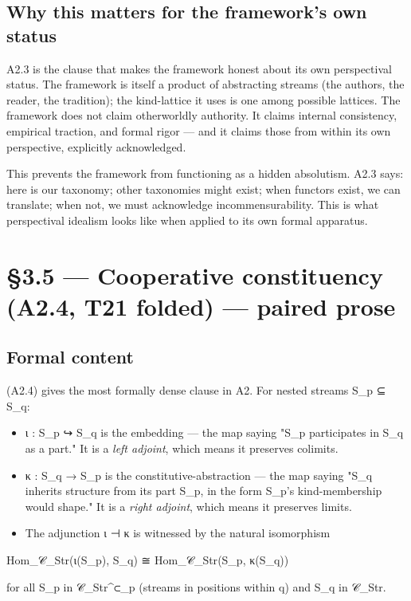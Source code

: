 \documentclass[11pt, openany]{book}
\newcommand{\sectionbreak}{\clearpage}
\begin{document}
\subsection{Why this matters for the framework's own status}

A2.3 is the clause that makes the framework honest about its own perspectival status. The framework is itself a product of abstracting streams (the authors, the reader, the tradition); the kind-lattice it uses is one among possible lattices. The framework does not claim otherworldly authority. It claims internal consistency, empirical traction, and formal rigor --- and it claims those from within its own perspective, explicitly acknowledged.

This prevents the framework from functioning as a hidden absolutism. A2.3 says: here is our taxonomy; other taxonomies might exist; when functors exist, we can translate; when not, we must acknowledge incommensurability. This is what perspectival idealism looks like when applied to its own formal apparatus.

\sectionbreak

\section{§3.5 --- Cooperative constituency (A2.4, T21 folded) --- paired prose}

\subsection{Formal content}

(A2.4) gives the most formally dense clause in A2. For nested streams S\_\allowbreak{}p ⊆ S\_\allowbreak{}q:

\begin{itemize}
\item ι : S\_\allowbreak{}p ↪ S\_\allowbreak{}q is the embedding --- the map saying "S\_\allowbreak{}p participates in S\_\allowbreak{}q as a part." It is a \textit{left adjoint}, which means it preserves colimits.
\item κ : S\_\allowbreak{}q → S\_\allowbreak{}p is the constitutive-abstraction --- the map saying "S\_\allowbreak{}q inherits structure from its part S\_\allowbreak{}p, in the form S\_\allowbreak{}p's kind-membership would shape." It is a \textit{right adjoint}, which means it preserves limits.
\item The adjunction ι ⊣ κ is witnessed by the natural isomorphism
\end{itemize}
\begin{Code}
  Hom_{𝒞_Str}(ι(S_p), S_q) ≅ Hom_{𝒞_Str}(S_p, κ(S_q))
\end{Code}
for all S\_\allowbreak{}p in 𝒞\_\allowbreak{}Str\textasciicircum{}⊂\_\allowbreak{}p (streams in positions within q) and S\_\allowbreak{}q in 𝒞\_\allowbreak{}Str.
\end{document}
